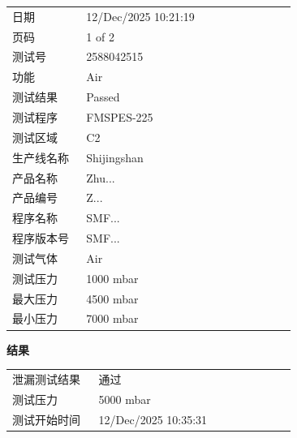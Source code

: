 \documentclass[UTF8,10pt,a4paper,fontset=fandol]{ctexart}
\newcommand{\fieldvalue}[1]{#1}
\begin{document}
\begin{tabular}{@{}p{0.24\linewidth}p{0.68\linewidth}@{}}
日期 &
\fieldvalue{12/Dec/2025 10:21:19}
\\
页码 &
\fieldvalue{1 of 2}
\\
测试号 &
\fieldvalue{2588042515}
\\
功能 &
\fieldvalue{Air}
\\
测试结果 &
\fieldvalue{Passed}
\\
测试程序 &
\fieldvalue{FMSPES-225}
\\
测试区域 &
\fieldvalue{C2}
\\
生产线名称 &
\fieldvalue{Shijingshan}
\\
产品名称 &
\fieldvalue{Zhu...}
\\
产品编号 &
\fieldvalue{Z...}
\\
程序名称 &
\fieldvalue{SMF...}
\\
程序版本号 &
\fieldvalue{SMF...}
\\
测试气体 &
\fieldvalue{Air}
\\
测试压力 &
\fieldvalue{1000 mbar}
\\
最大压力 &
\fieldvalue{4500 mbar}
\\
最小压力 &
\fieldvalue{7000 mbar}
\end{tabular}

\bigskip

\noindent\textbf{结果}

\begin{tabular}{@{}p{0.28\linewidth}p{0.64\linewidth}@{}}
泄漏测试结果 &
\fieldvalue{通过}
\\
测试压力 &
\fieldvalue{5000 mbar}
\\
测试开始时间 &
\fieldvalue{12/Dec/2025 10:35:31}
\\
\end{tabular}
\end{document}
